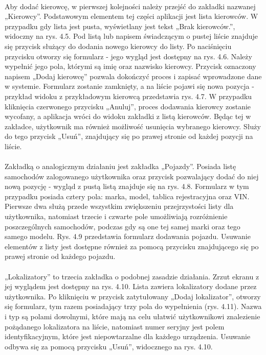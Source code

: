 \paragraph{}
Aby dodać kierowcę, w pierwszej kolejności należy przejść do zakładki nazwanej „Kierowcy”. Podstawowym elementem tej części aplikacji jest lista kierowców. W przypadku gdy lista jest pusta, wyświetlany jest tekst „Brak kierowców.”, widoczny na rys. 4.5. Pod listą lub napisem świadczącym o pustej liście znajduje się przycisk służący do dodania nowego kierowcy do listy. Po naciśnięciu przycisku otworzy się formularz - jego wygląd jest dostępny na rys. 4.6. Należy wypełnić jego pola, którymi są imię oraz nazwisko kierowcy. Przycisk oznaczony napisem „Dodaj kierowcę” pozwala dokończyć proces i zapisać wprowadzone dane w systemie. Formularz zostanie zamknięty, a na liście pojawi się nowa pozycja - przykład widoku z przykładowym kierowcą przedstawia rys. 4.7. W przypadku kliknięcia czerwonego przycisku „Anuluj”, proces dodawania kierowcy zostanie wycofany, a aplikacja wróci do widoku zakładki z listą kierowców. Będąc tej w zakładce, użytkownik ma również możliwość usunięcia wybranego kierowcy. Służy do tego przycisk „Usuń”, znajdujący się po prawej stronie od każdej pozycji na liście.

\paragraph{}
Zakładką o analogicznym działaniu jest zakładka „Pojazdy”. Posiada listę samochodów zalogowanego użytkownika oraz przycisk pozwalający dodać do niej nową pozycję - wygląd z pustą listą znajduje się na rys. 4.8. Formularz w tym przypadku posiada cztery pola: marka, model, tablica rejestracyjna oraz VIN. Pierwsze dwa służą przede wszystkim zwiększeniu przejrzystości listy dla użytkownika, natomiast trzecie i czwarte pole umożliwiają rozróżnienie poszczególnych samochodów, podczas gdy są one tej samej marki oraz tego samego modelu. Rys. 4.9 przedstawia formularz dodawania pojazdu. Usuwanie elementów z listy jest dostępne również za pomocą przycisku znajdującego się po prawej stronie od każdego pojazdu.

\paragraph{}
„Lokalizatory” to trzecia zakładka o podobnej zasadzie działania. Zrzut ekranu z jej wyglądem jest dostępny na rys. 4.10. Lista zawiera lokalizatory dodane przez użytkownika. Po kliknięciu w przycisk zatytułowany „Dodaj lokalizator”, otworzy się formularz, tym razem posiadający trzy pola do wypełnienia (rys. 4.11). Nazwa i typ są polami dowolnymi, które mają na celu ułatwić użytkownikowi znalezienie pożądanego lokalizatora na liście, natomiast numer seryjny jest polem identyfikacyjnym, które jest niepowtarzalne dla każdego urządzenia. Usuwanie odbywa się za pomocą przycisku „Usuń”, widocznego na rys. 4.10.

